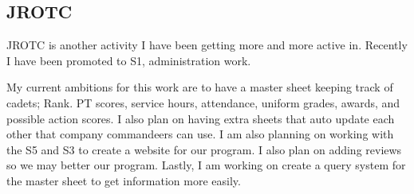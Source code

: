 \subsection{JROTC}
\par JROTC is another activity I have been getting more and more active in. Recently I have been promoted to S1, administration work. 
\par My current ambitions for this work are to have a master sheet keeping track of cadets; Rank. PT scores, service hours, attendance, uniform grades, awards, and possible action scores. I also plan on having extra sheets that auto update each other that company commandeers can use. I am also planning on working with the S5 and S3 to create a website for our program. I also plan on adding reviews so we may better our program. Lastly, I am working on create a query system for the master sheet to get information more easily.
